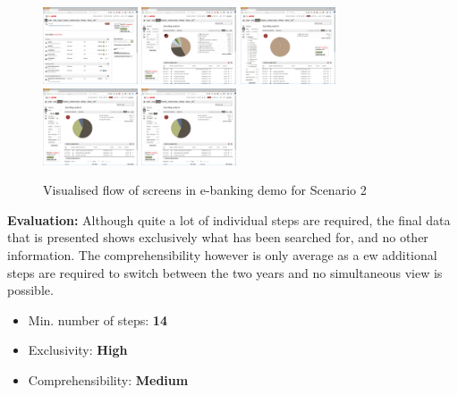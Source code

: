 \begin{figure}[h]
	\begin{center}
		\includegraphics[width=2.8cm]{03_Figures/09_Evaluation/UBS_1_Overview.png}
		\includegraphics[width=2.8cm]{03_Figures/09_Evaluation/UBS_2_SpendingAnalysis.png}
		\includegraphics[width=2.8cm]{03_Figures/09_Evaluation/UBS_2_SpendingAnalysis_FilterCat.png}
		\includegraphics[width=2.8cm]{03_Figures/09_Evaluation/UBS_2_SpendingAnalysis_Filter.png}
		\includegraphics[width=2.8cm]{03_Figures/09_Evaluation/UBS_2_SpendingAnalysis_Filter.png}
		\caption{Visualised flow of screens in e-banking demo for Scenario 2}
		\label{fig:scenariotwoebanking}
	\end{center}
\end{figure}


\textbf{Evaluation:}  Although quite a lot of individual steps are required, the final data that is presented shows exclusively what has been searched for, and no other information. The comprehensibility however is only average as a ew additional steps are required to switch between the two years and no simultaneous view is possible. 
\begin{itemize}[noitemsep,nolistsep]
	\item Min. number of steps: \textbf{14}
	\item Exclusivity: \textbf{High}
	\item Comprehensibility: \textbf{Medium}
\end{itemize}


